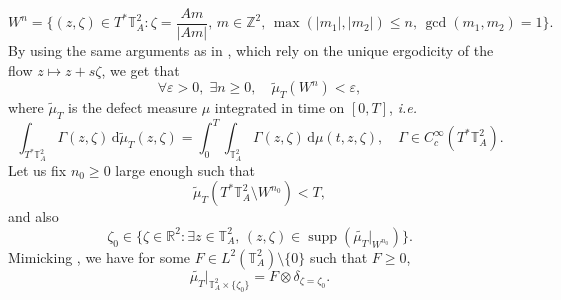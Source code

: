 \documentclass[a4paper,11pt]{amsart}
\numberwithin{equation}{section}
\theoremstyle{definition}
\DeclareMathOperator{\supp}{supp}
\newcommand{\twotorus}{\mathbb T^2_A}
\begin{document}
\[
    W^n = \bigg\{(z,\zeta)\in T^*\twotorus : \zeta = \frac{Am}{\vert Am\vert},\,m\in\mathbb Z^2,\,\max(\vert m_1\vert,\vert m_2\vert)\le n,\,\gcd(m_1,m_2) = 1\bigg\}.
\]
By using the same arguments as in \cite[Lemma 2.2]{BZ},
which rely on the unique ergodicity of the flow $z\mapsto z+s\zeta$, we get that
\[
    \forall\varepsilon>0,\;\exists n\geq0,\quad\widetilde\mu_T(W^n)<\varepsilon,
\]
where $\widetilde\mu_T$ is the defect measure $\mu$ integrated in time on $[0,T]$, \textit{i.e.}
\[
    \int_{T^*\twotorus}\Gamma(z,\zeta)\,\mathrm d\widetilde{\mu}_T(z,\zeta) 
    = \int_0^T\int_{\twotorus}\Gamma(z,\zeta)\,\mathrm d\mu(t,z,\zeta),\quad \Gamma\in C^{\infty}_c(T^*\twotorus).
\]
Let us fix $n_0\geq0$ large enough such that
\[
    \widetilde\mu_T(T^*\twotorus\setminus W^{n_0})<T,
\]
and also
\[
    \zeta_0\in\big\{\zeta\in\mathbb R^2 : \exists z\in\twotorus,\,(z,\zeta)\in\supp(\widetilde{\mu_T}\vert_{W^{n_0}})\big\}.
\]
Mimicking \cite[Lemma 2.3]{BZ}, we have for some $F\in L^2(\twotorus)\setminus\{0\}$ such that $F\geq0$,
\begin{equation}\label{eq:reducdim}
    \widetilde{\mu_T}\big\vert_{\twotorus\times\{\zeta_0\}} = F\otimes\delta_{\zeta = \zeta_0}.
\end{equation}
\end{document}
